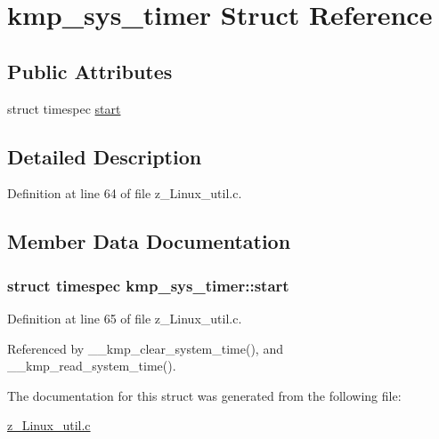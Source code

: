 \hypertarget{structkmp__sys__timer}{\section{kmp\-\_\-sys\-\_\-timer Struct Reference}
\label{structkmp__sys__timer}
}
\subsection*{Public Attributes}
\begin{DoxyCompactItemize}
\item 
struct timespec \hyperlink{structkmp__sys__timer_ae9f66812fe3c116738ebc985ab6f66f2}{start}
\end{DoxyCompactItemize}


\subsection{Detailed Description}


Definition at line 64 of file z\-\_\-\-Linux\-\_\-util.\-c.



\subsection{Member Data Documentation}
\hypertarget{structkmp__sys__timer_ae9f66812fe3c116738ebc985ab6f66f2}{
\subsubsection[{start}]{\setlength{\rightskip}{0pt plus 5cm}struct timespec kmp\-\_\-sys\-\_\-timer\-::start}}\label{structkmp__sys__timer_ae9f66812fe3c116738ebc985ab6f66f2}


Definition at line 65 of file z\-\_\-\-Linux\-\_\-util.\-c.



Referenced by \-\_\-\-\_\-kmp\-\_\-clear\-\_\-system\-\_\-time(), and \-\_\-\-\_\-kmp\-\_\-read\-\_\-system\-\_\-time().



The documentation for this struct was generated from the following file\-:\begin{DoxyCompactItemize}
\item 
\hyperlink{z__Linux__util_8c}{z\-\_\-\-Linux\-\_\-util.\-c}\end{DoxyCompactItemize}
